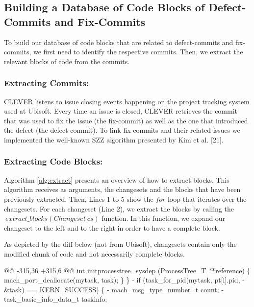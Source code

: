 \documentclass[sigconf]{acmart}
\newenvironment{Shaded}{}{}
\newcommand{\DataTypeTok}[1]{\textcolor[rgb]{0.56,0.13,0.00}{{#1}}}
\newcommand{\StringTok}[1]{\textcolor[rgb]{0.25,0.44,0.63}{{#1}}}
\newcommand{\NormalTok}[1]{{#1}}
\begin{document}
\subsection{Building a Database of Code Blocks of Defect-Commits and
Fix-Commits}\label{sec:offline}

To build our database of code blocks that are related to defect-commits
and fix-commits, we first need to identify the respective commits. Then,
we extract the relevant blocks of code from the commits.

\subsubsection{Extracting Commits:}\label{extracting-commits}

CLEVER listens to issue closing events happening on the project tracking
system used at Ubisoft. Every time an issue is closed, CLEVER retrieves
the commit that was used to fix the issue (the fix-commit) as well as
the one that introduced the defect (the defect-commit). To link
fix-commits and their related issues we implemented the well-known SZZ
algorithm presented by Kim et al. [21].

\subsubsection{Extracting Code Blocks:}\label{extracting-code-blocks}

Algorithm \ref{alg:extract} presents an overview of how to extract
blocks. This algorithm receives as arguments, the changesets and the
blocks that have been previously extracted. Then, Lines 1 to 5 show the
\(for\) loop that iterates over the changesets. For each changeset (Line
2), we extract the blocks by calling the
\(~extract\_blocks(Changeset~cs)\) function. In this function, we expand
our changeset to the left and to the right in order to have a complete
block.



As depicted by the diff below (not from Ubisoft), changesets contain
only the modified chunk of code and not necessarily complete blocks.

\begin{Shaded}
\begin{Highlighting}[]
\DataTypeTok{@@ -315,36 +315,6 @@}
\NormalTok{int initprocesstree_sysdep}
\NormalTok{(ProcessTree_T **reference) \{}
    \NormalTok{mach_port_deallocate(mytask,}
      \NormalTok{task);}
\NormalTok{\}}
\NormalTok{\}}
\StringTok{- if (task_for_pid(mytask, pt[i].pid,}
\StringTok{-  &task) == KERN_SUCCESS) \{}
\StringTok{-   mach_msg_type_number_t   count;}
\StringTok{-   task_basic_info_data_t   taskinfo;}
\end{Highlighting}
\end{Shaded}
\end{document}
